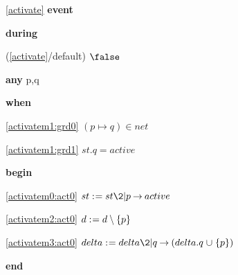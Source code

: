 \noindent \ref{activate}  \textbf{event}
\begin{block}
  \item   \textbf{during}
  \begin{block}
  \item[ (\ref{activate}/default) ]{$\false$} %
  \end{block}
  \item   \textbf{any} p,q
  \item   \textbf{when}
  \begin{block}
  \item[ \eqref{activatem1:grd0} ]{$(p \mapsto q) \in net $} %
  \item[ \eqref{activatem1:grd1} ]{$st.q = active $} %
  \end{block}
  \item   \textbf{begin}
  \begin{block}
  \item[ \eqref{activatem0:act0} ]{$st \bcmeq st \2| p \fun active $} %
  \item[ \eqref{activatem2:act0} ]{$d \mathrel{:\mkern1mu=} d \setminus \{ p \}$} %
  \item[ \eqref{activatem3:act0} ]{$delta \bcmeq delta \2| q \fun (delta.q \bunion \{p\})$} %
  \end{block}
  \item   \textbf{end} \\
\end{block}
